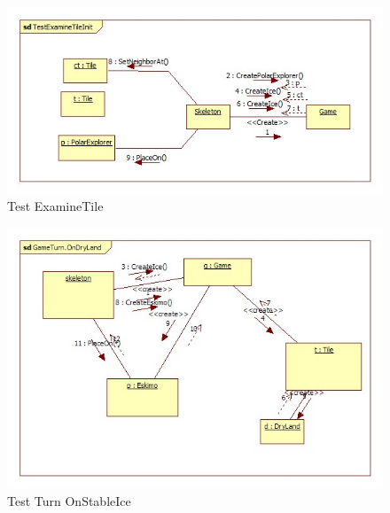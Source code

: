 \begin{figure}[h]
	\begin{center}
		\includegraphics[width=17cm]{chapters/chapter05/diagrams/Test_ExamineTile_init.jpg}
		\caption{Test ExamineTile}
		\label{fig:Test ExamineTile}
	\end{center}
\end{figure}

\begin{figure}[h]
	\begin{center}
		\includegraphics[width=17cm]{chapters/chapter05/diagrams/Test_Turn_OnStableIce_init.jpg}
		\caption{Test Turn OnStableIce}
		\label{fig:Test Turn OnStableIce}
	\end{center}
\end{figure}

